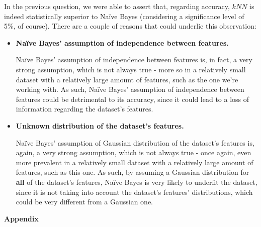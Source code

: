 \documentclass[12pt]{article}
\begin{document}
\begin{enumerate}[leftmargin=\labelsep,resume]
        \vspace*{0.5cm}

        In the previous question, we were able to assert that, regarding accuracy, $kNN$ is
        indeed statistically superior to Naïve Bayes (considering a significance level of
        5\%, of course). There are a couple of reasons that could underlie this observation:

        \begin{itemize}
          \item \textbf{Naïve Bayes' assumption of independence between features.}

                Naïve Bayes' assumption of independence between features is, in fact, a very
                strong assumption, which is not always true - more so in a relatively small dataset
                with a relatively large amount of features, such as the one we're working with.
                As such, Naïve Bayes' assumption of independence between features could be
                detrimental to its accuracy, since it could lead to a loss of information
                regarding the dataset's features.

          \item \textbf{Unknown distribution of the dataset's features.}

                Naïve Bayes' assumption of Gaussian distribution of the dataset's features
                is, again, a very strong assumption, which is not always true - once again,
                even more prevalent in a relatively small dataset with a relatively large
                amount of features, such as this one. As such, by assuming a Gaussian distribution
                for \textbf{all} of the dataset's features, Naïve Bayes is very likely to
                underfit the dataset, since it is not taking into account the dataset's
                features' distributions, which could be very different from a Gaussian one.
        \end{itemize}

\end{enumerate}

\pagebreak

\large{\textbf{Appendix}\vskip 0.3cm}


\end{document}

